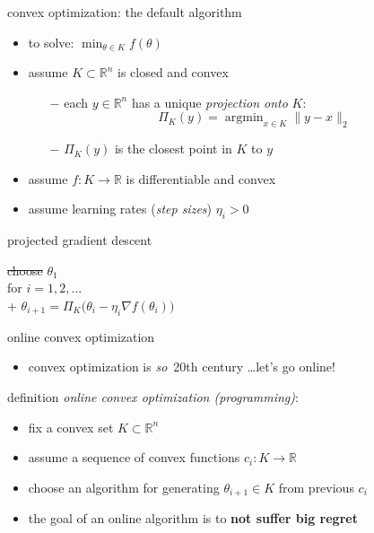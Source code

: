 \documentclass[xcolor={svgnames},
               hyperref={colorlinks,citecolor=DeepPink4,linkcolor=FireBrick,urlcolor=Maroon}]
               {beamer}
\newcommand{\grad}{\nabla}
\newcommand{\argmin}{\operatorname{argmin}}
\newcommand{\RR}{\mathbb{R}}
\newcommand{\ds}{\displaystyle}
\begin{document}
\begin{frame}{convex optimization: the default algorithm}

\begin{itemize}
\item to solve: \quad $\ds \min_{\theta \in K} f(\theta)$
\item assume $K\subset \RR^n$ is closed and convex
    \begin{itemize}
    \item[$-$] each $y\in \RR^n$ has a unique \emph{projection onto } $K$:
    $$\Pi_K(y) = \argmin_{x\in K} \|y - x\|_2$$
    \item[$-$] $\Pi_K(y)$ is the closest point in $K$ to $y$
    \end{itemize}
\item assume $f:K\to \RR$ is differentiable and convex
\item assume learning rates (\emph{step sizes}) $\eta_i>0$
\end{itemize}

\begin{block}{projected gradient descent}

\begin{pseudo*}
\st{choose} $\theta_1$ \\
for $i = 1,2,\dots$ \\+
    $\theta_{i+1} = \Pi_K \big(\theta_i - \eta_i \grad f(\theta_i)\big)$
\end{pseudo*}
\end{block}
\end{frame}


\begin{frame}{online convex optimization}

\begin{itemize}
\item convex optimization is \emph{so}\, 20th century \dots let's go online!
\end{itemize}

\begin{block}{definition}
\emph{online convex optimization (programming)}:

\begin{itemize}
\item fix a convex set $K\subset \RR^n$
\item assume a sequence of convex functions $c_i:K\to \RR$
\item choose an algorithm for generating $\theta_{i+1} \in K$ from previous $c_i$
\end{itemize}
\end{block}

\bigskip
\begin{itemize}
\item the goal of an online algorithm is to \textbf{not suffer big regret}
\end{itemize}
\end{frame}
\end{document}
